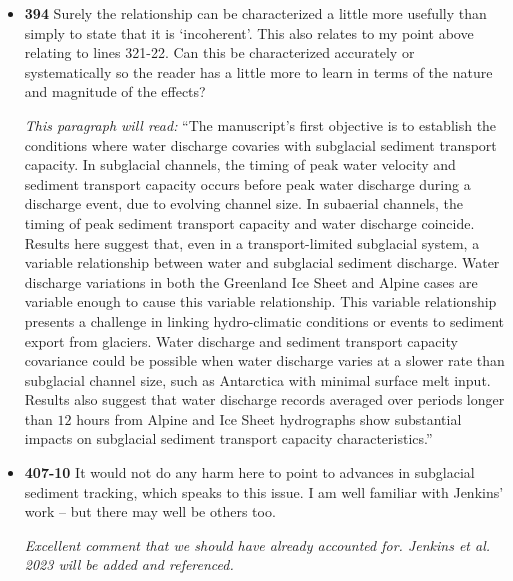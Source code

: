 \documentclass[11pt]{article}
\begin{document}
\begin{itemize}
\item \textbf{394} Surely the relationship can be characterized a little more usefully than
  simply to state that it is ‘incoherent’. This also relates to my point above
  relating to lines 321-22. Can this be characterized accurately or
  systematically so the reader has a little more to learn in terms of the nature
  and magnitude of the effects?

\textit{This paragraph will read:} ``The manuscript's first objective is to establish the conditions where water discharge covaries with subglacial sediment transport capacity.
In subglacial channels, the timing of peak water velocity and sediment transport capacity occurs before peak water discharge during a discharge event, due to evolving channel size.
In subaerial channels, the timing of peak sediment transport capacity and water discharge coincide.
Results here suggest that, even in a transport-limited subglacial system, a variable relationship between water and subglacial sediment discharge.
Water discharge variations in both the Greenland Ice Sheet and Alpine cases are variable enough to cause this variable relationship.
This variable relationship presents a challenge in linking hydro-climatic conditions or events to sediment export from glaciers.
Water discharge and sediment transport capacity covariance could be possible when water discharge varies at a slower rate than subglacial channel size, such as Antarctica with minimal surface melt input.
Results also suggest that water discharge records averaged over periods longer than $12$ hours from Alpine and Ice Sheet hydrographs show substantial impacts on subglacial sediment transport capacity characteristics.''

  
\item \textbf{407-10} It would not do any harm here to point to advances in subglacial sediment
  tracking, which speaks to this issue. I am well familiar with Jenkins’ work –
  but there may well be others too.

  \textit{Excellent comment that we should have already accounted for. Jenkins et al. 2023 will be added and referenced.}
  
\end{itemize}

 

\end{document}

